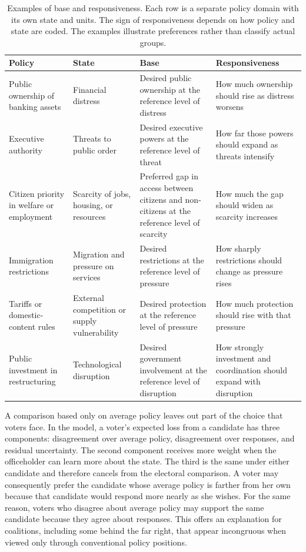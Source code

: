 \documentclass[12pt,letterpaper]{article}
\renewcommand{\arraystretch}{0.75}
\begin{document}
\begin{table}[t]
\centering
\small
\renewcommand{\arraystretch}{1.3}
\begin{tabular}{@{}L{3.1cm}L{2.7cm}L{4.1cm}L{4.7cm}@{}}
\toprule
Policy & State & Base & Responsiveness \\
\midrule
Public ownership of banking assets & Financial distress & Desired public ownership at the reference level of distress & How much ownership should rise as distress worsens \\
Executive authority & Threats to public order & Desired executive powers at the reference level of threat & How far those powers should expand as threats intensify \\
Citizen priority in welfare or employment & Scarcity of jobs, housing, or resources & Preferred gap in access between citizens and non-citizens at the reference level of scarcity & How much the gap should widen as scarcity increases \\
Immigration restrictions & Migration and pressure on services & Desired restrictions at the reference level of pressure & How sharply restrictions should change as pressure rises \\
Tariffs or domestic-content rules & External competition or supply vulnerability & Desired protection at the reference level of pressure & How much protection should rise with that pressure \\
Public investment in restructuring & Technological disruption & Desired government involvement at the reference level of disruption & How strongly investment and coordination should expand with disruption \\
\bottomrule
\end{tabular}
\caption{Examples of base and responsiveness. Each row is a separate policy domain with its own state and units. The sign of responsiveness depends on how policy and state are coded. The examples illustrate preferences rather than classify actual groups.}
\label{tab:examples}
\end{table}

A comparison based only on average policy leaves out part of the choice that voters face. In the model, a voter's expected loss from a candidate has three components: disagreement over average policy, disagreement over responses, and residual uncertainty. The second component receives more weight when the officeholder can learn more about the state. The third is the same under either candidate and therefore cancels from the electoral comparison. A voter may consequently prefer the candidate whose average policy is farther from her own because that candidate would respond more nearly as she wishes. For the same reason, voters who disagree about average policy may support the same candidate because they agree about responses. This offers an explanation for coalitions, including some behind the far right, that appear incongruous when viewed only through conventional policy positions.
\end{document}
